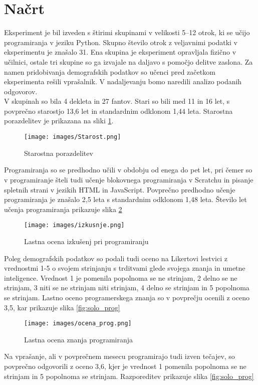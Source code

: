 \documentclass[a4paper,12pt,openright]{book}
\begin{document}
\section{Načrt}
Eksperiment je bil izveden s štirimi skupinami v velikosti 5–12 otrok, ki se učijo programiranja v jeziku Python. Skupno število otrok z veljavnimi podatki v eksperimentu je znašalo 31. Ena skupina je eksperiment opravljala fizično v učilnici, ostale tri skupine so ga izvajale na daljavo s pomočjo delitve zaslona. Za namen pridobivanja demografskih podatkov so učenci pred začetkom eksperimenta rešili vprašalnik. V nadaljevanju bomo naredili analizo podanih odgovorov.\\
V skupinah so bila 4 dekleta in 27 fantov. Stari so bili med 11 in 16 let, s povprečno starostjo 13,6 let in standardnim odklonom 1,44 leta. Starostna porazdelitev je prikazana na sliki \ref{fig:ages}. \\
\begin{figure}[H]
    \centering
    \texttt{[image: images/Starost.png]}
    \caption{Starostna porazdelitev}
    \label{fig:ages}
\end{figure}
Programiranja so se predhodno učili v obdobju od enega do pet let, pri čemer so v programiranje šteli tudi učenje blokovnega programiranja v Scratchu in pisanje spletnih strani v jezikih HTML in JavaScript. Povprečno predhodno učenje programiranja je znašalo 2,5 leta s standardnim odklonom 1,48 leta. Število let učenja programiranja prikazuje slika \ref{fig:izkusnje} \\
\begin{figure}[H]
    \centering
    \texttt{[image: images/izkusnje.png]}
    \caption{Lastna ocena izkušenj pri programiranju}
    \label{fig:izkusnje}
\end{figure}
Poleg demografskih podatkov so podali tudi oceno na Likertovi lestvici z vrednostmi 1-5 o svojem strinjanju s trditvami glede svojega znanja in umetne inteligence. Vrednost 1 je pomenila popolnoma se ne strinjam, 2 delno se ne strinjam, 3 niti se ne strinjam niti strinjam, 4 delno se strinjam in 5 popolnoma se strinjam. Lastno oceno programerskega znanja so v povprečju ocenili z oceno 3,5, kar prikazuje slika \ref{fig:solo_prog} \\
\begin{figure}[H]
    \centering
    \texttt{[image: images/ocena\_prog.png]}
    \caption{Lastna ocena znanja programiranja}
    \label{fig:ocena_prog}
\end{figure}
Na vprašanje, ali v povprečnem mesecu programirajo tudi izven tečajev, so povprečno odgovorili z oceno 3,6, kjer je vrednost 1 pomenila popolnoma se ne strinjam in 5 popolnoma se strinjam. Razporeditev prikazuje slika \ref{fig:solo_prog} \\
\end{document}
